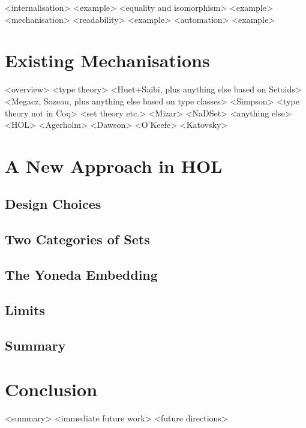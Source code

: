 \documentclass[twoside,titlepage,11pt]{article}
\begin{document}
<internalisation>%
  <example>
<equality and isomorphism>%
  <example>
<mechanisation>
  <readability>%
    <example>
  <automation>%
    <example>
\section{Existing Mechanisations}%
<overview>%
<type theory>%
  <Huet+Saibi, plus anything else based on Setoids>%
  <Megacz, Sozeau, plus anything else based on type classes>%
  <Simpson>%
  <type theory not in Coq>%
<set theory etc.>%
  <Mizar>%
  <NaDSet>%
  <anything else>%
<HOL>%
  <Agerholm>%
  <Dawson>%
  <O'Keefe>%
  <Katovsky>%
\section{A New Approach in HOL}%
\subsection{Design Choices}%
\subsection{Two Categories of Sets}%
\subsection{The Yoneda Embedding}%
\subsection{Limits}%
\subsection{Summary}%
\section{Conclusion}%
<summary>%
<immediate future work>%
<future directions>%


\end{document}
